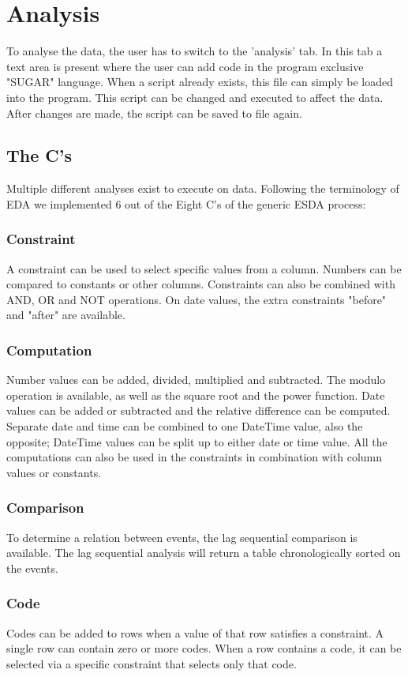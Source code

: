\section{Analysis}
To analyse the data, the user has to switch to the 'analysis' tab. In this tab a text area is present where the user can add code in the program exclusive "SUGAR" language. When a script already exists, this file can simply be loaded into the program. This script can be changed and executed to affect the data. After changes are made, the script can be saved to file again. 
\subsection{The C's}
Multiple different analyses exist to execute on data. Following the terminology of EDA we implemented 6 out of the Eight C's of the generic ESDA process\cite{analysis}:
\subsubsection{Constraint}
A constraint can be used to select specific values from a column. Numbers can be compared to constants or other columns. Constraints can also be combined with AND, OR and NOT operations. On date values, the extra constraints "before" and "after" are available. 
\subsubsection{Computation}
Number values can be added, divided, multiplied and subtracted. The modulo operation is available, as well as the square root and the power function. Date values can be added or subtracted and the relative difference can be computed. Separate date and time can be combined to one DateTime value, also the opposite; DateTime values can be split up to either date or time value. All the computations can also be used in the constraints in combination with column values or constants.
\subsubsection{Comparison}
To determine a relation between events, the lag sequential comparison is available. The lag sequential analysis will return a table chronologically sorted on the events.
\subsubsection{Code}
Codes can be added to rows when a value of that row satisfies a constraint. A single row can contain zero or more codes. When a row contains a code, it can be selected via a specific constraint that selects only that code. 
